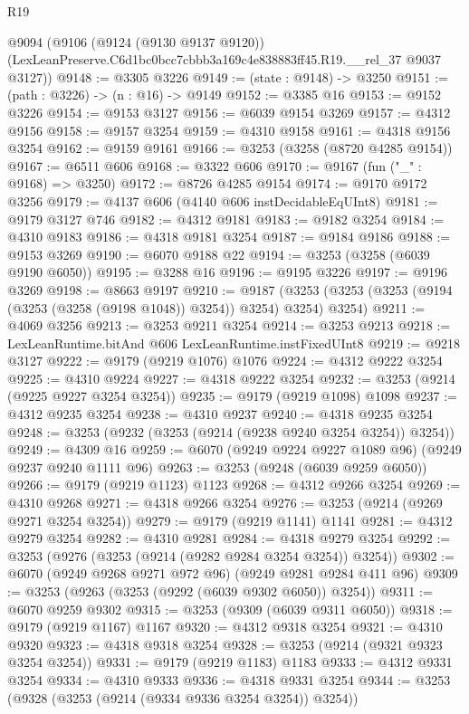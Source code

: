\begin{lexlean}{R19}
\begin{coremodule}
  @9094
    (@9106
      (@9124 (@9130 @9137 @9120))
      (LexLeanPreserve.C6d1bc0bcc7cbbb3a169c4e838883ff45.R19.__rel_37 @9037 @3127))
@9148 := @3305 @3226
@9149 := (state : @9148) -> @3250
@9151 := (path : @3226) -> (n : @16) -> @9149
@9152 := @3385 @16
@9153 := @9152 @3226
@9154 := @9153 @3127
@9156 := @6039 @9154 @3269
@9157 := @4312 @9156
@9158 := @9157 @3254
@9159 := @4310 @9158
@9161 := @4318 @9156 @3254
@9162 := @9159 @9161
@9166 := @3253 (@3258 (@8720 @4285 @9154))
@9167 := @6511 @606
@9168 := @3322 @606
@9170 := @9167 (fun ("_" : @9168) => @3250)
@9172 := @8726 @4285 @9154
@9174 := @9170 @9172 @3256
@9179 := @4137 @606 (@4140 @606 instDecidableEqUInt8)
@9181 := @9179 @3127 @746
@9182 := @4312 @9181
@9183 := @9182 @3254
@9184 := @4310 @9183
@9186 := @4318 @9181 @3254
@9187 := @9184 @9186
@9188 := @9153 @3269
@9190 := @6070 @9188 @22
@9194 := @3253 (@3258 (@6039 @9190 @6050))
@9195 := @3288 @16
@9196 := @9195 @3226
@9197 := @9196 @3269
@9198 := @8663 @9197
@9210 := @9187 (@3253 (@3253 (@3253 (@9194 (@3253 (@3258 (@9198 @1048)) @3254)) @3254) @3254) @3254)
@9211 := @4069 @3256
@9213 := @3253 @9211 @3254
@9214 := @3253 @9213
@9218 := LexLeanRuntime.bitAnd @606 LexLeanRuntime.instFixedUInt8
@9219 := @9218 @3127
@9222 := @9179 (@9219 @1076) @1076
@9224 := @4312 @9222 @3254
@9225 := @4310 @9224
@9227 := @4318 @9222 @3254
@9232 := @3253 (@9214 (@9225 @9227 @3254 @3254))
@9235 := @9179 (@9219 @1098) @1098
@9237 := @4312 @9235 @3254
@9238 := @4310 @9237
@9240 := @4318 @9235 @3254
@9248 := @3253 (@9232 (@3253 (@9214 (@9238 @9240 @3254 @3254)) @3254))
@9249 := @4309 @16
@9259 := @6070 (@9249 @9224 @9227 @1089 @96) (@9249 @9237 @9240 @1111 @96)
@9263 := @3253 (@9248 (@6039 @9259 @6050))
@9266 := @9179 (@9219 @1123) @1123
@9268 := @4312 @9266 @3254
@9269 := @4310 @9268
@9271 := @4318 @9266 @3254
@9276 := @3253 (@9214 (@9269 @9271 @3254 @3254))
@9279 := @9179 (@9219 @1141) @1141
@9281 := @4312 @9279 @3254
@9282 := @4310 @9281
@9284 := @4318 @9279 @3254
@9292 := @3253 (@9276 (@3253 (@9214 (@9282 @9284 @3254 @3254)) @3254))
@9302 := @6070 (@9249 @9268 @9271 @972 @96) (@9249 @9281 @9284 @411 @96)
@9309 := @3253 (@9263 (@3253 (@9292 (@6039 @9302 @6050)) @3254))
@9311 := @6070 @9259 @9302
@9315 := @3253 (@9309 (@6039 @9311 @6050))
@9318 := @9179 (@9219 @1167) @1167
@9320 := @4312 @9318 @3254
@9321 := @4310 @9320
@9323 := @4318 @9318 @3254
@9328 := @3253 (@9214 (@9321 @9323 @3254 @3254))
@9331 := @9179 (@9219 @1183) @1183
@9333 := @4312 @9331 @3254
@9334 := @4310 @9333
@9336 := @4318 @9331 @3254
@9344 := @3253 (@9328 (@3253 (@9214 (@9334 @9336 @3254 @3254)) @3254))

\end{coremodule}
\end{lexlean}
